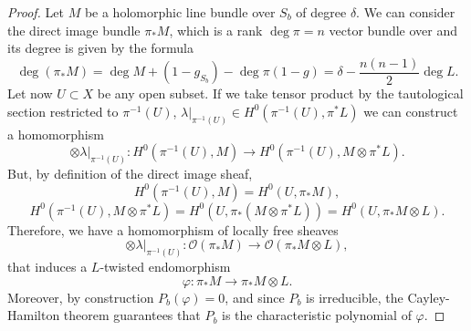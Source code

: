 \documentclass[12pt,a4paper]{book}
\theoremstyle{definition} \newtheorem{defn}[thm]{Definition}
\theoremstyle{definition} \newtheorem{ejemplo}[thm]{Example}
\theoremstyle{remark} \newtheorem{rem}[thm]{Remark}
\def\OO{\mathscr{O}}
\begin{document}
	\begin{proof}
	  Let $M$ be a holomorphic line bundle over $S_b$ of degree $\delta$. We can consider the direct image bundle $\pi_*M$, which is a rank $\deg \pi=n$ vector bundle over and its degree is given by the formula
	  \begin{equation*}
	    \deg(\pi_*M)=\deg M + (1-g_{S_b}) - \deg \pi (1-g)=\delta -  \frac{n(n-1)}{2}\deg L.
	  \end{equation*}
	  Let now $U\subset X$ be any open subset. If we take tensor product by the tautological section restricted to $\pi^{-1}(U)$, $\lambda|_{\pi^{-1}(U)} \in H^0(\pi^{-1}(U),\pi^*L)$ we can construct a homomorphism
	  \begin{equation*}
	    \otimes \lambda|_{\pi^{-1}(U)}: H^0(\pi^{-1}(U),M) \rightarrow H^0(\pi^{-1}(U),M \otimes \pi^*L).
	  \end{equation*}
	  But, by definition of the direct image sheaf,
	  \begin{equation*}
	    H^0(\pi^{-1}(U),M)=H^0(U,\pi_*M),
	  \end{equation*}
	  \begin{equation*}
	    H^0(\pi^{-1}(U),M\otimes \pi^{*}L)=H^0(U,\pi_*(M\otimes \pi^*L))=H^0(U,\pi_*M \otimes L).
	  \end{equation*}
	  Therefore, we have a homomorphism of locally free sheaves
	  \begin{equation*}
	     \otimes \lambda|_{\pi^{-1}(U)}: \OO(\pi_*M) \rightarrow \OO(\pi_*M \otimes L),
	  \end{equation*}
	  that induces a $L$-twisted endomorphism
	  \begin{equation*}
	    \varphi:\pi_*M \rightarrow \pi_*M\otimes L.
	  \end{equation*}
	  Moreover, by construction $P_b(\varphi)=0$, and since $P_b$ is irreducible, the Cayley-Hamilton theorem guarantees that $P_b$ is the characteristic polynomial of $\varphi$.


\end{proof}
\end{document}
